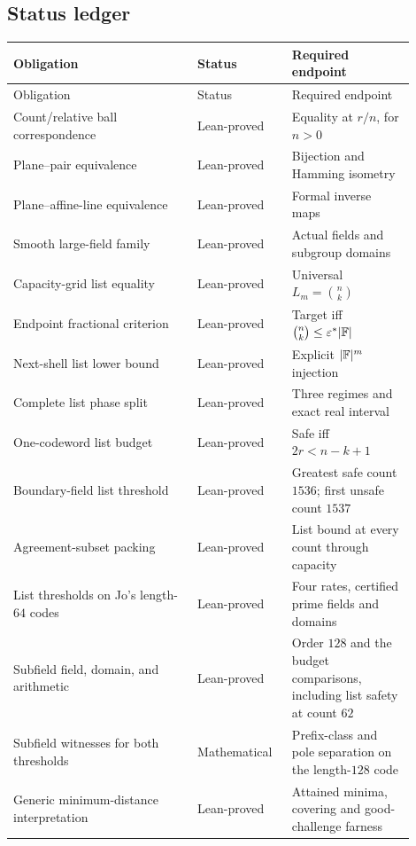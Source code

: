 \pagebreak
\subsection{Status ledger}

\begingroup
\small
\begin{longtable}{@{}>{\raggedright\arraybackslash}p{0.42\linewidth}
  >{\raggedright\arraybackslash}p{0.20\linewidth}
  >{\raggedright\arraybackslash}p{0.28\linewidth}@{}}
\toprule
Obligation & Status & Required endpoint\\
\midrule
\endfirsthead
\toprule
Obligation & Status & Required endpoint\\
\midrule
\endhead
Count/relative ball correspondence & Lean-proved & Equality at \(r/n\),
  for \(n>0\)\\
Plane--pair equivalence & Lean-proved & Bijection and Hamming isometry\\
Plane--affine-line equivalence & Lean-proved & Formal inverse maps\\
Smooth large-field family & Lean-proved & Actual fields and subgroup domains\\
Capacity-grid list equality & Lean-proved & Universal \(L_m=\binom nk\)\\
Endpoint fractional criterion & Lean-proved & Target iff
  \(\binom nk\le\varepsilon^\ast|\mathbb{F}|\)\\
Next-shell list lower bound & Lean-proved & Explicit \(|\mathbb{F}|^m\) injection\\
Complete list phase split & Lean-proved & Three regimes and exact real interval\\
One-codeword list budget & Lean-proved & Safe iff \(2r<n-k+1\)\\
Boundary-field list threshold & Lean-proved &
  Greatest safe count \(1536\); first unsafe count \(1537\)\\
Agreement-subset packing & Lean-proved & List bound at every count through capacity\\
List thresholds on Jo's length-\(64\) codes & Lean-proved & Four rates,
  certified prime fields and domains\\
Subfield field, domain, and arithmetic & Lean-proved & Order \(128\) and
  the budget comparisons, including list safety at count \(62\)\\
Subfield witnesses for both thresholds & Mathematical & Prefix-class and
  pole separation on the length-\(128\) code\\
Generic minimum-distance interpretation & Lean-proved & Attained minima,
  covering and good-challenge farness\\

\end{longtable}
